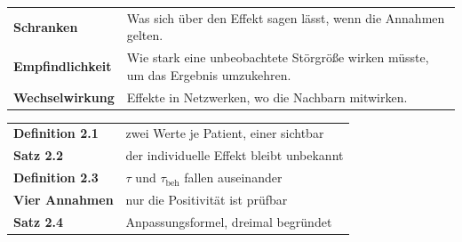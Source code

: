 \begin{forschung}
\begin{center}
{\small
\renewcommand{\arraystretch}{1.45}
\begin{tabular}{@{}P{2.8cm}P{5.4cm}@{}}
\toprule
\textbf{Schranken} & Was sich über den Effekt sagen lässt, wenn die Annahmen  gelten.\\
\textbf{Empfindlichkeit} & Wie stark eine unbeobachtete Störgröße wirken müsste, um das Ergebnis umzukehren.\\
\textbf{Wechselwirkung} & Effekte in Netzwerken, wo die Nachbarn mitwirken.\\
\bottomrule
\end{tabular}}
\end{center}

\begin{center}
\begin{minipage}{0.88\textwidth}
\end{minipage}
\end{center}
\end{forschung}

\begin{merksatz}
\begin{center}
\renewcommand{\arraystretch}{1.5}
\begin{tabular}{@{}P{3.0cm}P{5.6cm}@{}}
\toprule
\textbf{Definition 2.1} & zwei Werte je Patient, einer sichtbar\\
\textbf{Satz 2.2} & der individuelle Effekt bleibt unbekannt\\
\textbf{Definition 2.3} & $\tau$ und $\tau_{\text{beh}}$ fallen auseinander\\
\textbf{Vier Annahmen} & nur die Positivität ist prüfbar\\
\textbf{Satz 2.4} & Anpassungsformel, dreimal begründet\\
\bottomrule
\end{tabular}
\end{center}

\begin{center}
\begin{minipage}{0.88\textwidth}
\end{minipage}
\end{center}
\end{merksatz}
